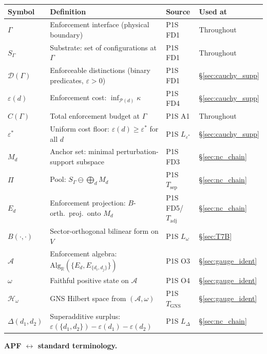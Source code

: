 \documentclass[11pt,a4paper]{article}
\theoremstyle{definition}
\newcommand{\eps}{\varepsilon}
\begin{document}
\smallskip
\begin{center}\small
\renewcommand{\arraystretch}{1.15}
\begin{tabular}{@{}lp{5.8cm}ll@{}}
\toprule
\textbf{Symbol} & \textbf{Definition} & \textbf{Source} & \textbf{Used at} \\
\midrule
$\Gamma$ & Enforcement interface (physical boundary) & P1S FD1 & Throughout \\
$S_\Gamma$ & Substrate: set of configurations at $\Gamma$ & P1S FD1 & Throughout \\
$\mathcal{D}(\Gamma)$ & Enforceable distinctions (binary predicates, $\eps > 0$) & P1S FD1 & \S\ref{sec:cauchy_supp} \\
$\eps(d)$ & Enforcement cost: $\inf_{\mathcal{P}(d)} \kappa$ & P1S FD4 & \S\ref{sec:cauchy_supp} \\
$C(\Gamma)$ & Total enforcement budget at $\Gamma$ & P1S A1 & Throughout \\
$\eps^*$ & Uniform cost floor: $\eps(d) \ge \eps^*$ for all $d$ & P1S $L_{\eps^*}$ & \S\ref{sec:cauchy_supp} \\
$M_d$ & Anchor set: minimal perturbation-support subspace & P1S FD3 & \S\ref{sec:nc_chain} \\
$\Pi$ & Pool: $S_\Gamma \ominus \bigoplus_d M_d$ & P1S $T_{\mathrm{sep}}$ & \S\ref{sec:nc_chain} \\
$E_d$ & Enforcement projection: $B$-orth.\ proj.\ onto $M_d$ & P1S FD5/$T_{\mathrm{adj}}$ & \S\ref{sec:nc_chain} \\
$B(\cdot,\cdot)$ & Sector-orthogonal bilinear form on $V$ & P1S $L_\omega$ & \S\ref{sec:T7B} \\
$\mathcal{A}$ & Enforcement algebra: $\mathrm{Alg}_\mathbb{R}(\{E_d, E_{\{d_i,d_j\}}\})$ & P1S O3 & \S\ref{sec:gauge_ident} \\
$\omega$ & Faithful positive state on $\mathcal{A}$ & P1S O4 & \S\ref{sec:gauge_ident} \\
$\mathcal{H}_\omega$ & GNS Hilbert space from $(\mathcal{A}, \omega)$ & P1S $T_{\mathrm{GNS}}$ & \S\ref{sec:gauge_ident} \\
$\Delta(d_1,d_2)$ & Superadditive surplus: $\eps(\{d_1,d_2\}) - \eps(d_1) - \eps(d_2)$ & P1S $L_\Delta$ & \S\ref{sec:nc_chain} \\
\bottomrule
\end{tabular}
\end{center}

\smallskip\noindent\textbf{APF $\leftrightarrow$ standard terminology.}
\end{document}
